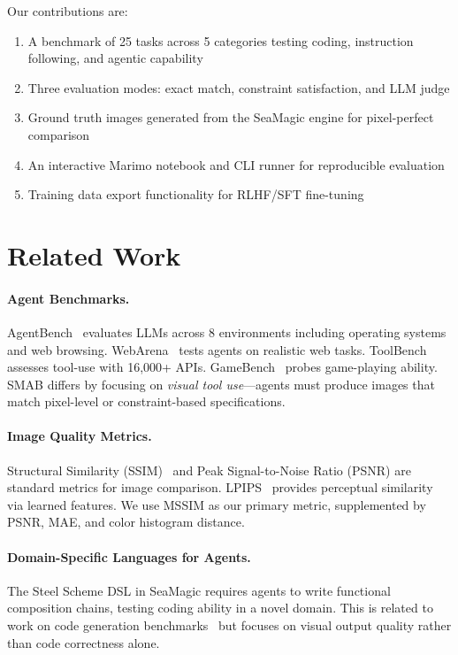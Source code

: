 \documentclass[11pt,a4paper]{article}
\begin{document}
Our contributions are:
\begin{enumerate}
    \item A benchmark of 25 tasks across 5 categories testing coding, instruction following, and agentic capability
    \item Three evaluation modes: exact match, constraint satisfaction, and LLM judge
    \item Ground truth images generated from the SeaMagic engine for pixel-perfect comparison
    \item An interactive Marimo notebook and CLI runner for reproducible evaluation
    \item Training data export functionality for RLHF/SFT fine-tuning
\end{enumerate}

\section{Related Work}

\paragraph{Agent Benchmarks.}
AgentBench~\citep{AgentBench} evaluates LLMs across 8 environments including operating systems and web browsing. WebArena~\citep{WebArena} tests agents on realistic web tasks. ToolBench~\citep{ToolBench} assesses tool-use with 16,000+ APIs. GameBench~\citep{GameBench} probes game-playing ability. SMAB differs by focusing on \emph{visual tool use}---agents must produce images that match pixel-level or constraint-based specifications.

\paragraph{Image Quality Metrics.}
Structural Similarity (SSIM)~\citep{SSIM} and Peak Signal-to-Noise Ratio (PSNR) are standard metrics for image comparison. LPIPS~\citep{LPIPS} provides perceptual similarity via learned features. We use MSSIM as our primary metric, supplemented by PSNR, MAE, and color histogram distance.

\paragraph{Domain-Specific Languages for Agents.}
The Steel Scheme DSL in SeaMagic requires agents to write functional composition chains, testing coding ability in a novel domain. This is related to work on code generation benchmarks~\citep{HumanEval} but focuses on visual output quality rather than code correctness alone.
\end{document}
